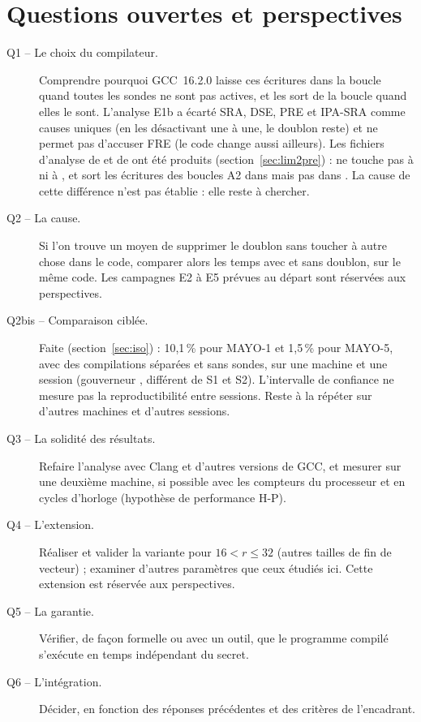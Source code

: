 \section*{Questions ouvertes et perspectives}\label{sec:persp}
\begin{description}
\item[Q1 -- Le choix du compilateur.] Comprendre pourquoi GCC~16.2.0 laisse ces écritures dans la boucle quand toutes les sondes ne sont pas actives, et les sort de la boucle quand elles le sont. L'analyse E1b a écarté SRA, DSE, PRE et IPA-SRA comme causes uniques (en les désactivant une à une, le doublon reste) et ne permet pas d'accuser FRE (le code change aussi ailleurs). Les fichiers d'analyse de  et de  ont été produits (section~\ref{sec:lim2pre}) :  ne touche pas à  ni à , et  sort les écritures des boucles A2 dans  mais pas dans . La cause de cette différence n'est pas établie : elle reste à chercher.
\item[Q2 -- La cause.] Si l'on trouve un moyen de supprimer le doublon sans toucher à autre chose dans le code, comparer alors les temps avec et sans doublon, sur le même code. Les campagnes E2 à E5 prévues au départ sont réservées aux perspectives.
\item[Q2bis -- Comparaison ciblée.] Faite (section~\ref{sec:iso}) : 10,1\,\% pour MAYO-1 et 1,5\,\% pour MAYO-5, avec des compilations séparées et sans sondes, sur une machine et une session (gouverneur , différent de S1 et S2). L'intervalle de confiance ne mesure pas la reproductibilité entre sessions. Reste à la répéter sur d'autres machines et d'autres sessions.
\item[Q3 -- La solidité des résultats.] Refaire l'analyse avec Clang et d'autres versions de GCC, et mesurer sur une deuxième machine, si possible avec les compteurs du processeur et en cycles d'horloge (hypothèse de performance H-P).
\item[Q4 -- L'extension.] Réaliser et valider la variante pour $16<r\le32$ (autres tailles de fin de vecteur) ; examiner d'autres paramètres que ceux étudiés ici. Cette extension est réservée aux perspectives.
\item[Q5 -- La garantie.] Vérifier, de façon formelle ou avec un outil, que le programme compilé s'exécute en temps indépendant du secret.
\item[Q6 -- L'intégration.] Décider, en fonction des réponses précédentes et des critères de l'encadrant.
\end{description}
